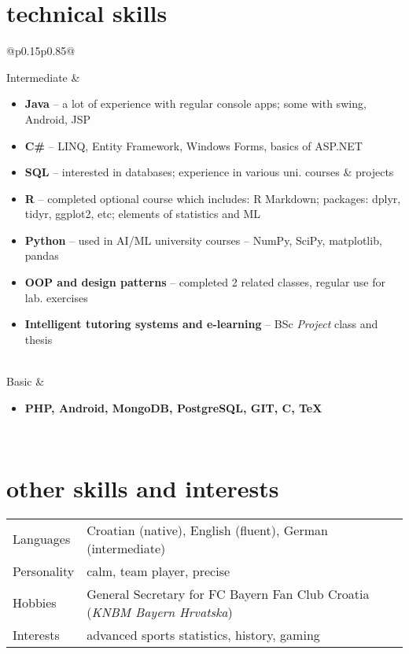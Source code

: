\documentclass[a4paper]{article}
\makeatletter
\newlength{\tablewidth}
\newenvironment{skills}{%
\setlength{\tablewidth}{\linewidth}
\addtolength{\tablewidth}{-2\tabcolsep}
\begin{tabular}{@{}p{0.15\tablewidth}p{0.85\tablewidth}@{}}
}{%
\end{tabular}
}
\makeatother
\begin{document}
\section{technical skills}
\begin{skills}
    Intermediate &
    \begin{itemize}
        \item \textbf{Java} -- a lot of experience with regular console apps; some with swing, Android, JSP
        \item \textbf{C\#} -- LINQ, Entity Framework, Windows Forms, basics of ASP.NET
        \item \textbf{SQL} -- interested in databases; experience in various uni. courses \& projects
        \item \textbf{R} -- completed optional course which includes:
        \newline
        R Markdown; packages: dplyr, tidyr, ggplot2, etc; elements of statistics and ML
        \item \textbf{Python} -- used in AI/ML university courses -- NumPy, SciPy, matplotlib, pandas
        \item \textbf{OOP and design patterns} -- completed 2 related classes, regular use for lab. exercises
        \item \textbf{Intelligent tutoring systems and e-learning} -- BSc \textit{Project} class and thesis
    \end{itemize}\\
    Basic &
    \begin{itemize}
        \item \textbf{PHP, Android, MongoDB, PostgreSQL, GIT, C, TeX}
    \end{itemize} \\
\end{skills}


\section{other skills and interests}
\begin{skills}
	Languages & Croatian (native), English (fluent), German (intermediate) \\
	Personality & calm, team player, precise \\
	Hobbies & General Secretary for  FC Bayern Fan Club Croatia (\textit{KNBM Bayern Hrvatska})\\
	Interests & advanced sports statistics, history, gaming \\
\end{skills}
\end{document}
